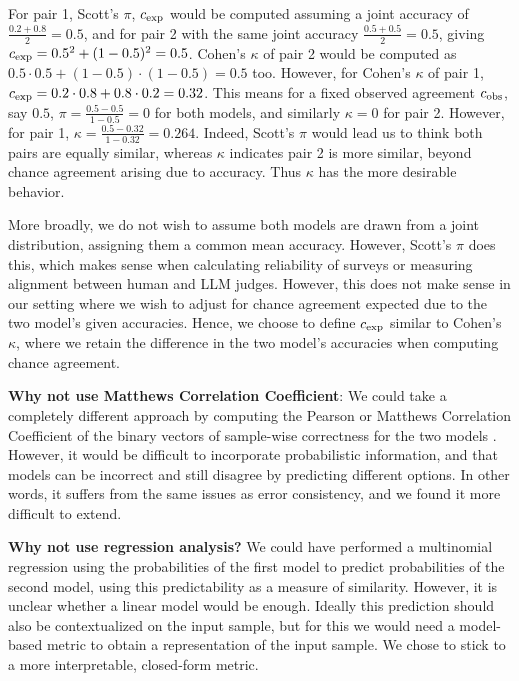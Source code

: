 For pair 1, Scott's $\pi$, $c_{\text{exp}}$ would be computed assuming a joint accuracy of $\frac{0.2 + 0.8}{2} = 0.5$, and for pair 2 with the same joint accuracy $\frac{0.5 + 0.5}{2} = 0.5$, giving $c_{\text{exp}} = 0.5^2 + (1-0.5)^2 = 0.5$. Cohen's $\kappa$ of pair 2 would be computed as $0.5 \cdot 0.5 + (1-0.5) \cdot (1 - 0.5) = 0.5$ too. However, for Cohen's $\kappa$ of pair 1, $c_{\text{exp}} = 0.2 \cdot 0.8 + 0.8 \cdot 0.2 = 0.32$. This means for a fixed observed agreement $c_{\text{obs}}$, say $0.5$, $\pi = \frac{0.5 - 0.5}{1 - 0.5} = 0$ for both models, and similarly $\kappa = 0$ for pair 2. However, for pair 1, $\kappa = \frac{0.5 - 0.32}{1 - 0.32} = 0.264$. Indeed, Scott's $\pi$ would lead us to think both pairs are equally similar, whereas $\kappa$ indicates pair 2 is more similar, beyond chance agreement arising due to accuracy. Thus $\kappa$ has the more desirable behavior. 

More broadly, we do not wish to assume both models are drawn from a joint distribution, assigning them a common mean accuracy. However, Scott's $\pi$ does this, which makes sense when calculating reliability of surveys or measuring alignment between human and LLM judges. However, this does not make sense in our setting where we wish to adjust for chance agreement expected due to the two model's given accuracies. Hence, we choose to define $c_{\text{exp}}$ similar to Cohen's $\kappa$, where we retain the difference in the two model's accuracies when computing chance agreement.

\textbf{Why not use Matthews Correlation Coefficient}: We could take a completely different approach by computing the Pearson or Matthews Correlation Coefficient of the binary vectors of sample-wise correctness for the two models \citep{chicco2021matthews}. However, it would be difficult to incorporate probabilistic information, and that models can be incorrect and still disagree by predicting different options. In other words, it suffers from the same issues as error consistency, and we found it more difficult to extend.

\textbf{Why not use regression analysis?} We could have performed a multinomial regression using the probabilities of the first model to predict probabilities of the second model, using this predictability as a measure of similarity. However, it is unclear whether a linear model would be enough. Ideally this prediction should also be contextualized on the input sample, but for this we would need a model-based metric to obtain a representation of the input sample. We chose to stick to a more interpretable, closed-form metric.

